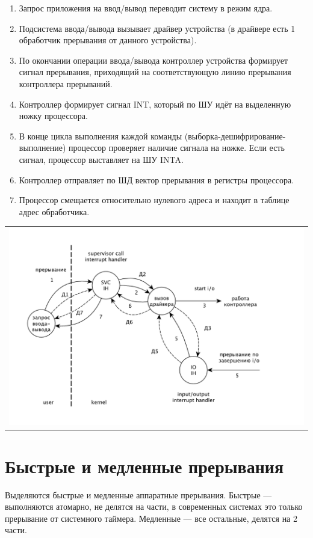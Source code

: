 \begin{enumerate}
	\item Запрос приложения на ввод/вывод переводит систему в режим ядра.
	\item Подсистема ввода/вывода вызывает драйвер устройства (в драйвере есть 1 обработчик прерывания от данного устройства).
	\item По окончании операции ввода/вывода контроллер устройства формирует сигнал прерывания, приходящий на соответствующую линию прерывания контроллера прерываний.
	\item Контроллер формирует сигнал INT, который по ШУ идёт на выделенную ножку процессора.
	\item В конце цикла выполнения каждой команды (выборка-дешифрирование-выполнение) процессор проверяет наличие сигнала на ножке. Если есть сигнал, процессор выставляет на ШУ INTA.
	\item Контроллер отправляет по ШД вектор прерывания в регистры процессора.
	\item Процессор смещается относительно нулевого адреса и находит в таблице адрес обработчика.
\end{enumerate}

\begin{table}[h!]
  \centering
  \begin{tabular}{p{1\linewidth}}
    \centering
    \includegraphics[width=0.8\linewidth]{./images/driver.pdf}
  \end{tabular}
\end{table}

\section{Быстрые и медленные прерывания}

Выделяются быстрые и медленные аппаратные прерывания. Быстрые --- выполняются атомарно, не делятся на части, в современных системах это только прерывание от системного таймера. Медленные --- все остальные, делятся на 2 части.

